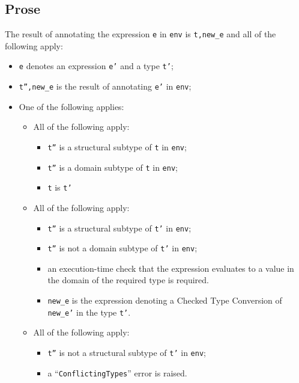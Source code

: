 \documentclass{book}
\begin{document}
  \subsection{Prose}
  The result of annotating the expression \texttt{e} in \texttt{env} is
\texttt{t,new\_e} and all of the following apply:
  \begin{itemize}
  \item \texttt{e} denotes an expression \texttt{e'} and a type \texttt{t'};
  \item \texttt{t'',new\_e} is the result of annotating \texttt{e'} in \texttt{env};
  \item One of the following applies:
    \begin{itemize}
    \item All of the following apply:
      \begin{itemize}
      \item \texttt{t''} is a structural subtype of \texttt{t} in \texttt{env};
      \item \texttt{t''} is a domain subtype of \texttt{t} in \texttt{env};
      \item \texttt{t} is \texttt{t'}
      \end{itemize}
    \item All of the following apply:
      \begin{itemize}
      \item \texttt{t''} is a structural subtype of \texttt{t'} in \texttt{env};
      \item \texttt{t''} is not a domain subtype of \texttt{t'} in \texttt{env};
      \item an execution-time check that the expression evaluates to a value in the
        domain of the required type is required.
      \item \texttt{new\_e} is the expression denoting a Checked Type
        Conversion of \texttt{new\_e'} in the type \texttt{t'}.
     \end{itemize}
   \item All of the following apply:
     \begin{itemize}
     \item \texttt{t''} is not a structural subtype of \texttt{t'} in \texttt{env};
     \item a ``\texttt{ConflictingTypes}'' error is raised.
     \end{itemize}
   \end{itemize}
  \end{itemize}
\end{document}
